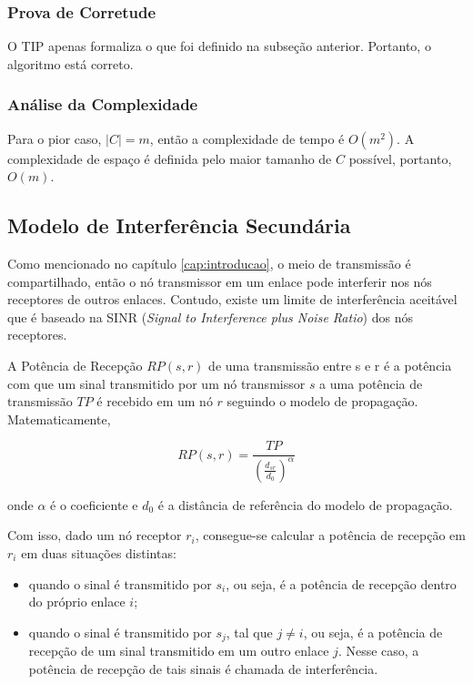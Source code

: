 \subsubsection{Prova de Corretude}

O TIP apenas formaliza o que foi definido na subseção anterior. Portanto, o algoritmo está correto. 

\subsubsection{Análise da Complexidade}

Para o pior caso, $|C|=m$, então a complexidade de tempo é $O(m^2)$. A complexidade de espaço é definida pelo maior tamanho de $C$ possível, portanto, $O(m)$.

\subsection{Modelo de Interferência Secundária}

Como mencionado no capítulo \ref{cap:introducao}, o meio de transmissão é compartilhado, então o nó transmissor em um enlace pode interferir nos nós receptores de outros enlaces. Contudo, existe um limite de interferência aceitável que é baseado na SINR ({\it Signal to Interference plus Noise Ratio})   dos nós receptores.

A Potência de Recepção $RP(s,r)$ de uma transmissão entre s e r é a potência com que um sinal transmitido por um nó transmissor $s$ a uma potência de transmissão $TP$ é recebido em um nó $r$ seguindo o modelo de propagação. Matematicamente,

\begin{equation}
RP(s,r) = \frac{TP}{(\frac{d_{sr}}{d_{0}})^{\alpha}}
\label{eq:rp}
\end{equation}

onde $\alpha$ é o coeficiente e $d_{0}$ é a distância de referência do modelo de propagação.

Com isso, dado um nó receptor $r_{i}$, consegue-se calcular a potência de recepção em $r_{i}$ em duas situações distintas:

\begin{itemize} %

\item quando o sinal é transmitido por $s_{i}$, ou seja, é a potência de recepção dentro do próprio enlace $i$; 
\item quando o sinal é transmitido por $s_{j}$, tal que $j \neq i$, ou seja, é a potência de recepção de um sinal transmitido em um outro enlace $j$. Nesse caso, a potência de recepção de tais sinais é chamada de interferência. 

\end{itemize}

